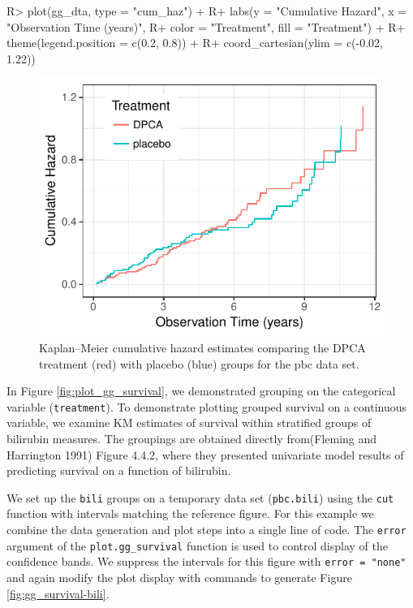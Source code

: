 \documentclass[article, nojss]{jss}
\begin{document}
\begin{Schunk}
\begin{Sinput}
R> plot(gg_dta, type = "cum_haz") +
R+   labs(y = "Cumulative Hazard", x = "Observation Time (years)",
R+        color = "Treatment", fill = "Treatment") +
R+   theme(legend.position = c(0.2, 0.8)) +
R+   coord_cartesian(ylim = c(-0.02, 1.22))
\end{Sinput}
\begin{figure}[!htb]

{\centering \includegraphics{rfs-plot_gg_cum_hazard-1}

}

\caption[Kaplan--Meier cumulative hazard estimates comparing the DPCA treatment (red) with placebo (blue) groups for the pbc data set]{Kaplan--Meier cumulative hazard estimates comparing the DPCA treatment (red) with placebo (blue) groups for the pbc data set.}\label{fig:plot_gg_cum_hazard}
\end{figure}
\end{Schunk}

In Figure \ref{fig:plot_gg_survival}, we demonstrated grouping on the
categorical variable (\texttt{treatment}). To demonstrate plotting
grouped survival on a continuous variable, we examine KM estimates of
survival within stratified groups of bilirubin measures. The groupings
are obtained directly from(Fleming and Harrington 1991) Figure 4.4.2,
where they presented univariate model results of predicting survival on
a function of bilirubin.

We set up the \texttt{bili} groups on a temporary data set
(\texttt{pbc.bili}) using the \texttt{cut} function with intervals
matching the reference figure. For this example we combine the data
generation and plot steps into a single line of code. The \texttt{error}
argument of the \texttt{plot.gg\_survival} function is used to control
display of the confidence bands. We suppress the intervals for this
figure with \texttt{error\ =\ "none"} and again modify the plot display
with  commands to generate Figure
\ref{fig:gg_survival-bili}.
\end{document}

